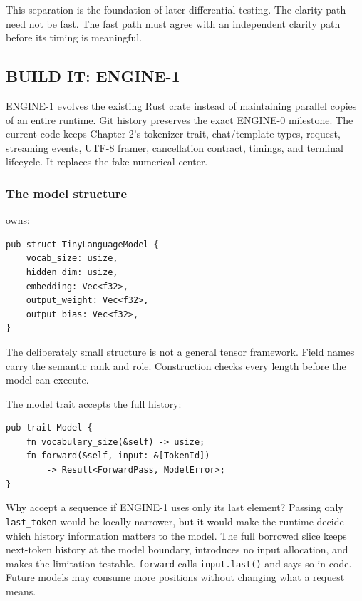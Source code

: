 \documentclass[
  10pt,
]{article}
\begin{document}
This separation is the foundation of later differential testing. The
clarity path need not be fast. The fast path must agree with an
independent clarity path before its timing is meaningful.

\subsection{BUILD IT: ENGINE-1}\label{build-it-engine-1}

ENGINE-1 evolves the existing Rust crate instead of maintaining parallel
copies of an entire runtime. Git history preserves the exact ENGINE-0
milestone. The current code keeps Chapter 2's tokenizer trait,
chat/template types, request, streaming events, UTF-8 framer,
cancellation contract, timings, and terminal lifecycle. It replaces the
fake numerical center.

\subsubsection{The model structure}\label{the-model-structure}

\texttt{} owns:

\begin{verbatim}
pub struct TinyLanguageModel {
    vocab_size: usize,
    hidden_dim: usize,
    embedding: Vec<f32>,
    output_weight: Vec<f32>,
    output_bias: Vec<f32>,
}
\end{verbatim}

The deliberately small structure is not a general tensor framework.
Field names carry the semantic rank and role. Construction checks every
length before the model can execute.

The model trait accepts the full history:

\begin{verbatim}
pub trait Model {
    fn vocabulary_size(&self) -> usize;
    fn forward(&self, input: &[TokenId])
        -> Result<ForwardPass, ModelError>;
}
\end{verbatim}

Why accept a sequence if ENGINE-1 uses only its last element? Passing
only \texttt{last\_token} would be locally narrower, but it would make
the runtime decide which history information matters to the model. The
full borrowed slice keeps next-token history at the model boundary,
introduces no input allocation, and makes the limitation testable.
\texttt{forward} calls \texttt{input.last()} and says so in code. Future
models may consume more positions without changing what a request means.
\end{document}
